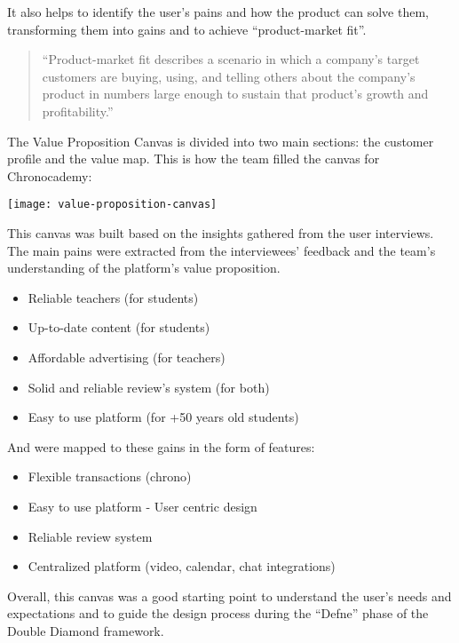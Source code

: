 It also helps to identify the user's pains and how the product can solve them, transforming them into gains and to achieve ``product-market fit''.\newline
\begin{quote}
    ``Product-market fit describes a scenario in which a company’s target
    customers are buying, using, and telling others about the company’s
    product in numbers large enough to sustain that product’s growth and
    profitability.''~\cite[Product Market Fit]{productMarketFit}
\end{quote}

The Value Proposition Canvas is divided into two main sections: the customer profile and the value map.
This is how the team filled the canvas for Chronocademy:

\begin{center}
    \texttt{[image: value-proposition-canvas]}
\end{center}

This canvas was built based on the insights gathered from the user interviews.
The main pains were extracted from the interviewees' feedback and the team's understanding of the platform's value proposition.
\begin{itemize}
    \item Reliable teachers (for students)
    \item Up-to-date content (for students)
    \item Affordable advertising (for teachers)
    \item Solid and reliable review's system (for both)
    \item Easy to use platform (for +50 years old students)
\end{itemize}
And were mapped to these gains in the form of features:
\begin{itemize}
    \item Flexible transactions (chrono)
    \item Easy to use platform - User centric design
    \item Reliable review system
    \item Centralized platform (video, calendar, chat integrations)
\end{itemize}

Overall, this canvas was a good starting point to understand the user's needs and expectations and to guide the design process during the ``Defne'' phase of the Double Diamond framework.

